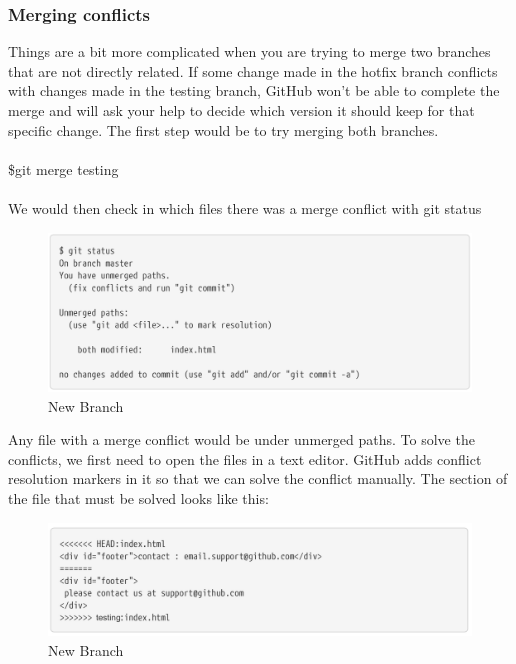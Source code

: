 \documentclass[12pt]{article}
\begin{document}
    \subsubsection{Merging conflicts}
    Things are a bit more complicated when you are trying to merge two branches that are not directly related. If some change made in the hotfix branch conflicts with changes made in the testing branch, GitHub won't be able to complete the merge and will ask your help to decide which version it should keep for that specific change. The first step would be to try merging both branches. \\
     \\
    \indent\indent \$git merge testing \\
    \\
    We would then check in which files there was a merge conflict with git status  \\
    \begin{figure}[h]
	\caption{New Branch}
	\includegraphics[scale=0.5]{figure9}
	\centering
    \end{figure} 
    \vspace{0.2 in}
    Any file with a merge conflict would be under unmerged paths. To solve the conflicts, we first need to open the files in a text editor. GitHub adds conflict resolution markers in it so that we can solve the conflict manually. The section of the file that must be solved looks like this: \\
    \begin{figure}[h]
	\caption{New Branch}
	\includegraphics[scale=0.5]{figure10}
	\centering
    \end{figure} \\
\end{document}
